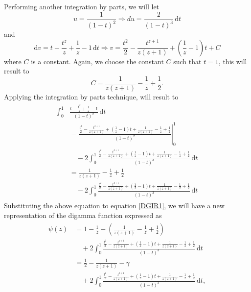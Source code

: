 Performing another integration by parts, we will let 
\begin{equation}
    u = \frac{1}{(1-t)^{2}} \Longrightarrow du = \frac{2}{(1-t)^3} \, \mathrm{d}t
\end{equation}
and 
\begin{equation}
\mathrm{d}v =t - \frac{t^{z}}{z}+\frac{1}{z} - 1 \, \mathrm{d}t \Longrightarrow v = \frac{t^2}{2} - \frac{t^{z+1}}{z(z+1)}+\left(\frac{1}{z} - 1\right)t +C
\end{equation}
where $C$ is a constant. Again, we choose the constant $C$ such that $t = 1$, this will result to
\begin{equation}
    C = \frac{1}{z(z+1)}-\frac{1}{z} +\frac{1}{2}.
\end{equation}
Applying the integration by parts technique, will result to
\begin{align}
\begin{split}
    \int_{0}^{1} & \frac{t - \frac{t^{z}}{z}+\frac{1}{z} - 1}{(1-t)^2} \, \mathrm{d}t \\& = \left.  \frac{\frac{t^2}{2} - \frac{t^{z+1}}{z(z+1)}+\left(\frac{1}{z} - 1\right)t + \frac{1}{z(z+1)}-\frac{1}{z} +\frac{1}{2}}{(1-t)^{2}} \right|_{0}^{1}
    \\& \quad - 2\int_{0}^{1} \frac{\frac{t^2}{2} - \frac{t^{z+1}}{z(z+1)}+\left(\frac{1}{z} - 1\right)t+\frac{1}{z(z+1)}-\frac{1}{z} +\frac{1}{2}}{(1-t)^{3}} \, \mathrm{d}t
    \\& = \frac{1}{z(z+1)}-\frac{1}{z} +\frac{1}{2}
    \\& \quad - 2\int_{0}^{1} \frac{\frac{t^2}{2} - \frac{t^{z+1}}{z(z+1)}+\left(\frac{1}{z} - 1\right)t+\frac{1}{z(z+1)}-\frac{1}{z} +\frac{1}{2}}{(1-t)^{3}} \, \mathrm{d}t
\end{split}
\end{align}
Substituting the above equation to equation \eqref{DGIR1}, we will have a new representation of the digamma function expressed as
\begin{align}
\begin{split}
    \psi(z) \,&  = 1-\frac{1}{z} - \left( \frac{1}{z(z+1)}-\frac{1}{z} +\frac{1}{2} \right)
    \\& \quad + 2\int_{0}^{1} \frac{\frac{t^2}{2} - \frac{t^{z+1}}{z(z+1)}+\left(\frac{1}{z} - 1\right)t+\frac{1}{z(z+1)}-\frac{1}{z} +\frac{1}{2}}{(1-t)^{3}} \, \mathrm{d}t
    \\& = \frac{1}{2} - \frac{1}{z(z+1)} - \gamma
    \\& \quad + 2\int_{0}^{1} \frac{\frac{t^2}{2} - \frac{t^{z+1}}{z(z+1)}+\left(\frac{1}{z} - 1\right)t+\frac{1}{z(z+1)}-\frac{1}{z} +\frac{1}{2}}{(1-t)^{3}} \, \mathrm{d}t,
\end{split}
\end{align}
